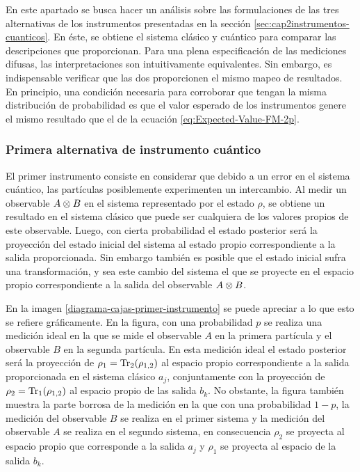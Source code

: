 En este apartado se busca hacer un análisis sobre las formulaciones de las tres
alternativas de los instrumentos presentadas en la sección
{\ref{sec:cap2instrumentos-cuanticos}}. En éste, se obtiene el sistema clásico
y cuántico para comparar las descripciones que proporcionan. Para una plena
especificación de las mediciones difusas, las interpretaciones son
intuitivamente equivalentes. Sin embargo, es indispensable verificar que las
dos proporcionen el mismo mapeo de resultados. En principio, una condición
necesaria para corroborar que tengan la misma distribución de probabilidad es
que el valor esperado de los instrumentos genere el mismo resultado que el de
la ecuación {\eqref{eq:Expected-Value-FM-2p}}. 


\subsubsection{Primera alternativa de instrumento cuántico} %

El primer instrumento consiste en considerar que debido a un error en el
sistema cuántico, las partículas posiblemente experimenten un intercambio. Al
medir un observable ${A \otimes B}$ en el sistema representado por el estado
$\rho$, se obtiene un resultado  en el sistema clásico que puede ser cualquiera
de los valores propios de este observable. Luego, con cierta probabilidad el
estado posterior será la proyección del estado inicial del sistema al estado
propio correspondiente a la salida proporcionada. Sin embargo también es
posible que el estado inicial sufra una transformación, y sea este cambio del
sistema el que se proyecte en el espacio propio correspondiente a la salida del
observable $A\otimes B$.


En la imagen {\ref{diagrama-cajas-primer-instrumento}} se puede apreciar a lo
que esto se refiere gráficamente.  En la figura, con una probabilidad $p$ se
realiza una medición ideal en la que se mide el observable $A$ en la primera
partícula y el observable $B$ en la segunda partícula. En esta medición ideal
el estado posterior será la proyección de $\rho_1={\rm Tr}_2(\rho_{1,2})$ al espacio
propio correspondiente a la salida proporcionada en el sistema clásico $a_j$,
conjuntamente con la proyección de $\rho_2={\rm Tr}_1(\rho_{1,2})$ al espacio propio
de las salida $b_k$.  No obstante, la figura también muestra la parte borrosa
de la medición en la que con una probabilidad $1-p$, la medición del observable
$B$ se realiza en el primer sistema y la medición del observable $A$ se realiza
en el segundo sistema, en consecuencia $\rho_2$ se proyecta al espacio propio
que corresponde a la salida $a_j$ y $\rho_1$ se proyecta al espacio de la
salida $b_k$.


